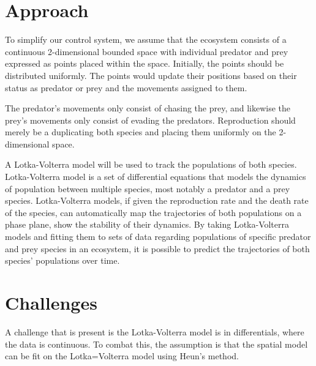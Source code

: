 
\section{Approach}

To simplify our control system, we assume that the ecosystem consists of a continuous 2-dimensional bounded space with individual predator and prey expressed as points placed within the space. Initially, the points should be distributed uniformly. The points would update their positions based on their status as predator or prey and the movements assigned to them.

The predator's movements only consist of chasing the prey, and likewise the prey's movements only consist of evading the predators. Reproduction should merely be a duplicating both species and placing them uniformly on the 2-dimensional space.

A Lotka-Volterra model will be used to track the populations of both species.  Lotka-Volterra model is a set of differential equations that models the dynamics of population between multiple species, most notably a predator and a prey species.
Lotka-Volterra models, if given the reproduction rate and the death rate of the species, can automatically map the trajectories of both populations on a phase plane, show the stability of their dynamics.
By taking Lotka-Volterra models and fitting them to sets of data regarding populations of specific predator and prey species in an ecosystem, it is possible to predict the trajectories of both species' populations over time.

\section{Challenges}

A challenge that is present is the Lotka-Volterra model is in differentials, where the data is continuous. To combat this, the assumption is that the spatial model can be fit on the Lotka=Volterra model using Heun's method.
